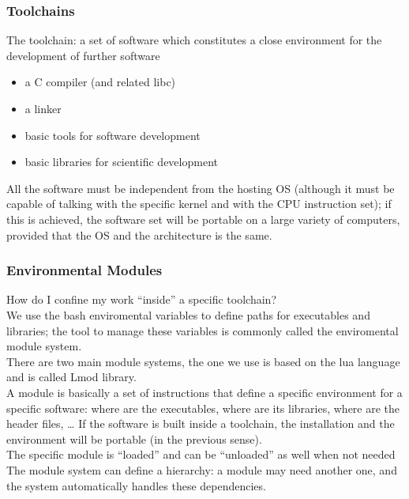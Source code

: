 \documentclass[9pt]{beamer}
\begin{document}
\begin{frame}
\frametitle{Toolchains}
The toolchain: a set of software which constitutes a close environment for the development of further software

\begin{itemize}
\item 	a C compiler (and related libc)
\item 	a linker
\item basic tools for software development
\item 	basic libraries for scientific development
\end{itemize}	

All the software must be independent from the hosting OS 
(although it must be capable of talking with the specific kernel and with the CPU instruction set); if this is achieved, the software set will be portable on a large variety of computers, provided that the OS and the architecture is the same.

\end{frame}

\begin{frame}
\frametitle{Environmental Modules}

How do I confine my work “inside” a specific toolchain?\\[3mm]

We use the bash enviromental variables to define paths for executables and libraries; the tool to manage these variables is commonly called 
the enviromental module system.\\[3mm]

There are two main module systems, the one we use is based on the lua language and is called Lmod library.\\[3mm]

A module is basically a set of instructions that define a specific environment for a specific software: where are the executables, where are its libraries, where are the header files, … 
If the software is built inside a toolchain, the installation and the environment  will be portable (in the previous sense).\\[3mm]

The specific module is “loaded” and can be “unloaded” as well when not needed\\[3mm]

The module system can define a hierarchy: a module may need another one, and the system automatically handles these dependencies.

\end{frame}
\end{document}
